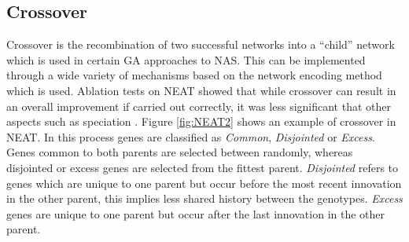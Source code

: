 \documentclass{article}
\begin{document}
	\subsection{Crossover}\label{crossover}

		Crossover is the recombination of two successful networks into a “child” network which is used in certain GA approaches to NAS. \cite{3}\cite{24}\cite{5} This can be implemented through a wide variety of mechanisms based on the network encoding method which is used. Ablation tests on NEAT showed that while crossover can result in an overall improvement if carried out correctly, it was less significant that other aspects such as speciation \cite{5}\cite{24}. Figure \ref{fig:NEAT2} shows an example of crossover in NEAT. In this process genes are classified as \textit{Common}, \textit{Disjointed} or \textit{Excess}. Genes common to both parents are selected between randomly, whereas disjointed or excess genes are selected from the fittest parent. \textit{Disjointed} refers to genes which are unique to one parent but occur before the most recent innovation in the other parent, this implies less shared history between the genotypes. \textit{Excess} genes are unique to one parent but occur after the last innovation in the other parent.
\end{document}
